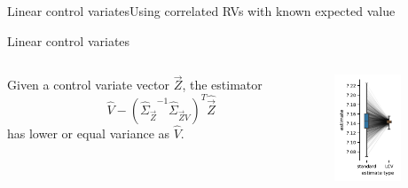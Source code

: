 \documentclass[9pt]{beamer}
\newcommand{\T}{T}
\newcommand{\bottomcite}[1]{\vspace*{\fill} {\scriptsize \parencite{#1}}}
\begin{document}
\begin{frame}{Linear control variates}{Using correlated RVs with known expected value}
\begin{block}{Linear control variates}
        \begin{columns}
            \begin{column}{.6\textwidth}
                Given a control variate vector $\vec{Z}$, the estimator
                \[\hat{V} -({\hat\Sigma_{ \vec{Z}}}^{-1}{\hat\Sigma}_{ \vec{Z} V})^{\T}{\hat{\vec{Z}}} \]
                has lower or equal variance as $\hat{V}$.
            \end{column}
            \begin{column}{.2\textwidth}
                \includegraphics[width=20mm]{../gfx/adjustment_trans.pdf}
            \end{column}
        \end{columns}
    \end{block}
    \bottomcite{backenkohler2019control}
\end{frame}
\end{document}
